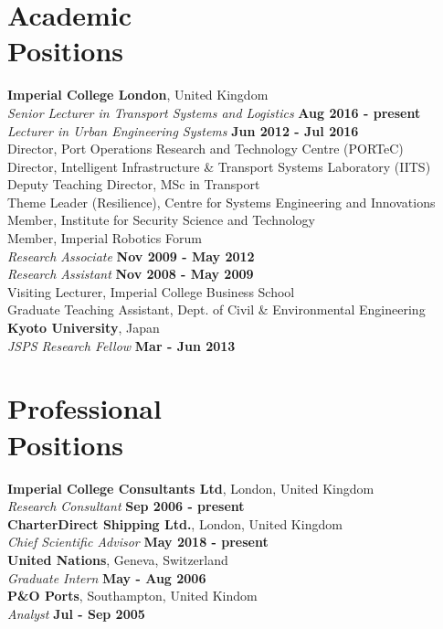 \documentclass[margin]{res}
\newcommand\tab[1][1cm]{\hspace*{#1}}
\begin{document}
\begin{resume}
\section{\sc Academic\\ Positions}
	{\bf Imperial College London}, United Kingdom \\
		\tab[0.2in] \textit{Senior Lecturer in Transport Systems and Logistics} \hfill {\bf Aug 2016 - present}\\
		\tab[0.2in] \textit{Lecturer in Urban Engineering Systems} \hfill {\bf Jun 2012 - Jul 2016}\\
			\tab[0.4in] Director, Port Operations Research and Technology Centre (PORTeC) \\
			\tab[0.4in] Director, Intelligent Infrastructure \& Transport Systems Laboratory (IITS) \\
			\tab[0.4in] Deputy Teaching Director, MSc in Transport \\
			\tab[0.4in] Theme Leader (Resilience), Centre for Systems Engineering and Innovations \\
			\tab[0.4in] Member, Institute for Security Science and Technology \\
			\tab[0.4in] Member, Imperial Robotics Forum \\
		\tab[0.2in] \textit{Research Associate} \hfill {\bf Nov 2009 - May 2012}\\
		\tab[0.2in] \textit{Research Assistant} \hfill {\bf Nov 2008 - May 2009}\\
			\tab[0.4in] Visiting Lecturer, Imperial College Business School \\
			\tab[0.4in] Graduate Teaching Assistant, Dept. of Civil \& Environmental Engineering \\
	{\bf Kyoto University}, Japan \\
		\tab[0.2in] \textit{JSPS Research Fellow} \hfill {\bf Mar - Jun 2013}\\

\vspace{-0.20in}
\section{\sc Professional\\ Positions}
	{\bf Imperial College Consultants Ltd}, London, United Kingdom \\
		\tab[0.2in] \textit{Research Consultant} \hfill {\bf Sep 2006 - present}\\
	{\bf CharterDirect Shipping Ltd.}, London, United Kingdom \\
		\tab[0.2in] \textit{Chief Scientific Advisor} \hfill {\bf May 2018 - present}\\
	{\bf United Nations}, Geneva, Switzerland \\
		\tab[0.2in] \textit{Graduate Intern} \hfill {\bf May - Aug 2006}\\
	{\bf P\&O Ports}, Southampton, United Kindom \\
		\tab[0.2in] \textit{Analyst} \hfill {\bf Jul - Sep 2005}\\


\end{resume}
\end{document}
